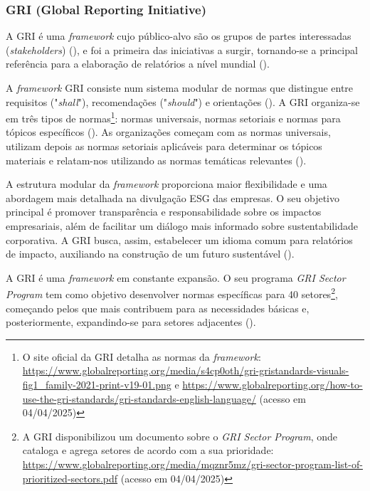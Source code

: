 \subsubsection{GRI (Global Reporting Initiative)}
\label{subsubsec: GRI}

A \gls{GRI} é uma \textit{framework} cujo público-alvo são os grupos de partes interessadas (\textit{stakeholders}) (\cite{GRISASB2021}), e foi a primeira das iniciativas a surgir, tornando-se a principal referência para a elaboração de relatórios a nível mundial (\cite{Luque-Vlchez2023}).

A \textit{framework} GRI consiste num sistema modular de normas que distingue entre requisitos ("\textit{shall}"), recomendações ("\textit{should}") e orientações (\cite{Adams2022}). A \gls{GRI} organiza-se em três tipos de normas\footnote{O site oficial da \gls{GRI} detalha as normas da \textit{framework}: \url{https://www.globalreporting.org/media/s4cp0oth/gri-gristandards-visuals-fig1_family-2021-print-v19-01.png} e \url{https://www.globalreporting.org/how-to-use-the-gri-standards/gri-standards-english-language/} (acesso em 04/04/2025)}: normas universais, normas setoriais e normas para tópicos específicos (\cite{GRI2025}). As organizações começam com as normas universais, utilizam depois as normas setoriais aplicáveis para determinar os tópicos materiais e relatam-nos utilizando as normas temáticas relevantes (\cite{GRISector2025}).

A estrutura modular da \textit{framework} proporciona maior flexibilidade e uma abordagem mais detalhada na divulgação \gls{ESG} das empresas. O seu objetivo principal é promover transparência e responsabilidade sobre os impactos empresariais, além de facilitar um diálogo mais informado sobre sustentabilidade corporativa. A GRI busca, assim, estabelecer um idioma comum para relatórios de impacto, auxiliando na construção de um futuro sustentável (\cite{Adams2022}).

A GRI é uma \textit{framework} em constante expansão. O seu programa \textit{GRI Sector Program} tem como objetivo desenvolver normas específicas para 40 setores\footnote{A GRI disponibilizou um documento sobre o \textit{GRI Sector Program}, onde cataloga e agrega setores de acordo com a sua prioridade: \url{https://www.globalreporting.org/media/mqznr5mz/gri-sector-program-list-of-prioritized-sectors.pdf} (acesso em 04/04/2025)}, começando pelos que mais contribuem para as necessidades básicas e, posteriormente, expandindo-se para setores adjacentes (\cite{GRISector2025}).

